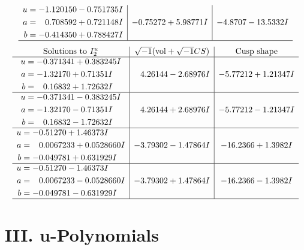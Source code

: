 \documentclass[1p]{elsarticle_modified}
\theoremstyle{definition}
\newcommand{\I}{\sqrt{-1}}
\begin{document}
$$\begin{array}{c|c|c}
\begin{aligned}
u &= -1.120150 - 0.751735 I \\
a &= \phantom{-}0.708592 + 0.721148 I \\
b &= -0.414350 + 0.788427 I\end{aligned}
 & -0.75272 + 5.98771 I & -4.8707 - 13.5332 I\\
 \hline 
 \end{array}$$\newpage$$\begin{array}{c|c|c}  
\text{Solutions to }I^u_{2}& \I (\text{vol} + \sqrt{-1}CS) & \text{Cusp shape}\\
 \hline 
\begin{aligned}
u &= -0.371341 + 0.383245 I \\
a &= -1.32170 + 0.71351 I \\
b &= \phantom{-}0.16832 + 1.72632 I\end{aligned}
 & \phantom{-}4.26144 - 2.68976 I & -5.77212 + 1.21347 I \\ \hline\begin{aligned}
u &= -0.371341 - 0.383245 I \\
a &= -1.32170 - 0.71351 I \\
b &= \phantom{-}0.16832 - 1.72632 I\end{aligned}
 & \phantom{-}4.26144 + 2.68976 I & -5.77212 - 1.21347 I \\ \hline\begin{aligned}
u &= -0.51270 + 1.46373 I \\
a &= \phantom{-}0.0067233 + 0.0528660 I \\
b &= -0.049781 + 0.631929 I\end{aligned}
 & -3.79302 - 1.47864 I & -16.2366 + 1.3982 I \\ \hline\begin{aligned}
u &= -0.51270 - 1.46373 I \\
a &= \phantom{-}0.0067233 - 0.0528660 I \\
b &= -0.049781 - 0.631929 I\end{aligned}
 & -3.79302 + 1.47864 I & -16.2366 - 1.3982 I\\
 \hline 
 \end{array}$$\newpage
\newpage\renewcommand{\arraystretch}{1}
\centering \section*{ III. u-Polynomials}
\end{document}
